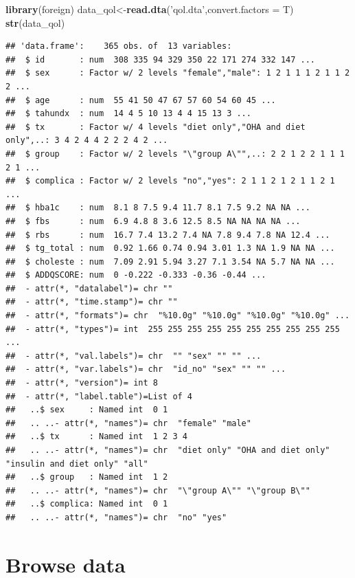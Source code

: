 \documentclass[]{book}
\newenvironment{Shaded}{\begin{snugshade}}{\end{snugshade}}
\newcommand{\KeywordTok}[1]{\textcolor[rgb]{0.13,0.29,0.53}{\textbf{#1}}}
\newcommand{\DataTypeTok}[1]{\textcolor[rgb]{0.13,0.29,0.53}{#1}}
\newcommand{\StringTok}[1]{\textcolor[rgb]{0.31,0.60,0.02}{#1}}
\newcommand{\NormalTok}[1]{#1}
\theoremstyle{definition}
\theoremstyle{definition}
\theoremstyle{remark}
\begin{document}
\begin{Shaded}
\begin{Highlighting}[]
\KeywordTok{library}\NormalTok{(foreign)}
\NormalTok{data_qol<-}\KeywordTok{read.dta}\NormalTok{(}\StringTok{'qol.dta'}\NormalTok{,}\DataTypeTok{convert.factors =}\NormalTok{ T)}
\KeywordTok{str}\NormalTok{(data_qol)}
\end{Highlighting}
\end{Shaded}

\begin{verbatim}
## 'data.frame':    365 obs. of  13 variables:
##  $ id       : num  308 335 94 329 350 22 171 274 332 147 ...
##  $ sex      : Factor w/ 2 levels "female","male": 1 2 1 1 1 2 1 1 2 2 ...
##  $ age      : num  55 41 50 47 67 57 60 54 60 45 ...
##  $ tahundx  : num  14 4 5 10 13 4 4 15 13 3 ...
##  $ tx       : Factor w/ 4 levels "diet only","OHA and diet only",..: 3 4 2 4 4 2 2 2 4 2 ...
##  $ group    : Factor w/ 2 levels "\"group A\"",..: 2 2 1 2 2 1 1 1 2 1 ...
##  $ complica : Factor w/ 2 levels "no","yes": 2 1 1 2 1 2 1 1 2 1 ...
##  $ hba1c    : num  8.1 8 7.5 9.4 11.7 8.1 7.5 9.2 NA NA ...
##  $ fbs      : num  6.9 4.8 8 3.6 12.5 8.5 NA NA NA NA ...
##  $ rbs      : num  16.7 7.4 13.2 7.4 NA 7.8 9.4 7.8 NA 12.4 ...
##  $ tg_total : num  0.92 1.66 0.74 0.94 3.01 1.3 NA 1.9 NA NA ...
##  $ choleste : num  7.09 2.91 5.94 3.27 7.1 3.54 NA 5.7 NA NA ...
##  $ ADDQSCORE: num  0 -0.222 -0.333 -0.36 -0.44 ...
##  - attr(*, "datalabel")= chr ""
##  - attr(*, "time.stamp")= chr ""
##  - attr(*, "formats")= chr  "%10.0g" "%10.0g" "%10.0g" "%10.0g" ...
##  - attr(*, "types")= int  255 255 255 255 255 255 255 255 255 255 ...
##  - attr(*, "val.labels")= chr  "" "sex" "" "" ...
##  - attr(*, "var.labels")= chr  "id_no" "sex" "" "" ...
##  - attr(*, "version")= int 8
##  - attr(*, "label.table")=List of 4
##   ..$ sex     : Named int  0 1
##   .. ..- attr(*, "names")= chr  "female" "male"
##   ..$ tx      : Named int  1 2 3 4
##   .. ..- attr(*, "names")= chr  "diet only" "OHA and diet only" "insulin and diet only" "all"
##   ..$ group   : Named int  1 2
##   .. ..- attr(*, "names")= chr  "\"group A\"" "\"group B\""
##   ..$ complica: Named int  0 1
##   .. ..- attr(*, "names")= chr  "no" "yes"
\end{verbatim}

\section{Browse data}\label{browse-data}
\end{document}
